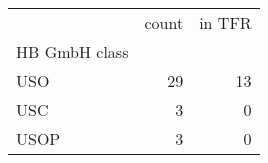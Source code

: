 \begin{tabular}{lrr}
\toprule
 & count & in TFR \\
HB GmbH class &  &  \\
\midrule
USO & 29 & 13 \\
USC & 3 & 0 \\
USOP & 3 & 0 \\
\bottomrule
\end{tabular}
